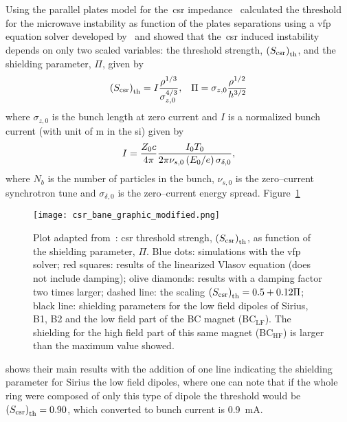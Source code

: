     \def \Scsr {\fof{S_\text{csr}}_\text{th}}
    Using the parallel plates model for the~\gls{csr} impedance~ calculated the threshold for the microwave instability as function of the plates separations using a \gls{vfp} equation solver developed by~ and showed that the~\gls{csr} induced instability depends on only two scaled variables: the threshold strength, $\Scsr$, and the shielding parameter, $\Pi$, given by
    \begin{align}\label{eq:csr_shielding_strength}
        \Scsr = I\frac{\rho^{1/3}}{\sigma_{z,0}^{4/3}}, & &  \Pi = \sigma_{z,0}\frac{\rho^{1/2}}{h^{3/2}}
    \end{align}
    where $\sigma_{z,0}$ is the bunch length at zero current and $I$ is a normalized bunch current (with unit of \si{\meter} in the \gls{si}) given by
    \begin{align}\label{eq:normalized_current}
        I = \frac{Z_0c}{4\pi}\frac{I_0T_0}{2\pi\nu_{s,0}\left(E_0/e\right)\sigma_{\delta,0}},
    \end{align}
    where $N_b$ is the number of particles in the bunch, $\nu_{s,0}$ is the zero--current synchrotron tune and $\sigma_{\delta,0}$ is the zero--current energy spread. Figure~\ref{fig:csr_bane_graphic_modified}
    \begin{figure}
        \centering
        \texttt{[image: csr\_bane\_graphic\_modified.png]}
        \caption[CSR driven longitudinal instability (adapted from~).]{Plot adapted from~: \gls{csr} threshold strengh, $\Scsr$, as function of the shielding parameter, $\Pi$. Blue dots: simulations with the \gls{vfp} solver; red squares: results of the linearized Vlasov equation (does not include damping); olive diamonds: results with a damping factor two times larger; dashed line: the scaling $\Scsr = 0.5 + 0.12\Pi$; black line: shielding parameters for the low field dipoles of Sirius, B1, B2 and the low field part of the BC magnet (BC$_\text{LF}$). The shielding for the high field part of this same magnet (BC$_\text{HF}$) is larger than the maximum value showed.}
        \label{fig:csr_bane_graphic_modified}
    \end{figure}
    shows their main results with the addition of one line indicating the shielding parameter for Sirius the low field dipoles, where one can note that if the whole ring were composed of only this type of dipole the threshold would be $\Scsr=0.90$, which converted to bunch current is \SI{0.9}{\milli\ampere}.

